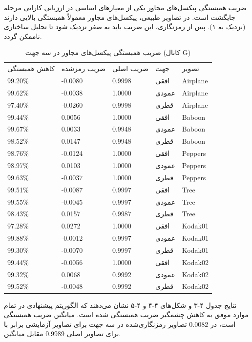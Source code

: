 ضریب همبستگی پیکسل‌های مجاور یکی از معیارهای اساسی در ارزیابی کارایی مرحله جایگشت است. در تصاویر طبیعی، پیکسل‌های مجاور معمولاً همبستگی بالایی دارند (نزدیک به ۱). پس از رمزنگاری، این ضریب باید به صفر نزدیک شود تا تحلیل ساختاری ناممکن گردد.

\begin{table}[h]
\centering
\small
\begin{tabular}{lllll}
\hline
کاهش همبستگی & ضریب رمزشده & ضریب اصلی & جهت & تصویر \\
‎99.20\%‎ & ‎-0.0080‎ & ‎0.9998‎ & افقی & ‎Airplane‎ \\
‎99.62\%‎ & ‎-0.0038‎ & ‎1.0000‎ & عمودی & ‎Airplane‎ \\
‎97.40\%‎ & ‎-0.0260‎ & ‎0.9998‎ & قطری & ‎Airplane‎ \\
‎99.44\%‎ & ‎0.0056‎ & ‎1.0000‎ & افقی & ‎Baboon‎ \\
‎99.67\%‎ & ‎0.0033‎ & ‎0.9948‎ & عمودی & ‎Baboon‎ \\
‎98.52\%‎ & ‎0.0147‎ & ‎0.9948‎ & قطری & ‎Baboon‎ \\
‎98.76\%‎ & ‎-0.0124‎ & ‎1.0000‎ & افقی & ‎Peppers‎ \\
‎98.97\%‎ & ‎0.0103‎ & ‎1.0000‎ & عمودی & ‎Peppers‎ \\
‎99.63\%‎ & ‎-0.0037‎ & ‎1.0000‎ & قطری & ‎Peppers‎ \\
‎99.51\%‎ & ‎-0.0087‎ & ‎0.9997‎ & افقی & ‎Tree‎ \\
‎99.55\%‎ & ‎-0.0045‎ & ‎0.9997‎ & عمودی & ‎Tree‎ \\
‎98.43\%‎ & ‎0.0157‎ & ‎0.9987‎ & قطری & ‎Tree‎ \\
‎97.28\%‎ & ‎0.0272‎ & ‎1.0000‎ & افقی & ‎Kodak01‎ \\
‎99.88\%‎ & ‎-0.0012‎ & ‎0.9997‎ & عمودی & ‎Kodak01‎ \\
‎99.30\%‎ & ‎-0.0070‎ & ‎0.9997‎ & قطری & ‎Kodak01‎ \\
‎99.44\%‎ & ‎-0.0056‎ & ‎1.0000‎ & افقی & ‎Kodak02‎ \\
‎99.32\%‎ & ‎0.0068‎ & ‎0.9992‎ & عمودی & ‎Kodak02‎ \\
‎99.52\%‎ & ‎-0.0048‎ & ‎0.9992‎ & قطری & ‎Kodak02‎ \\
\hline
\end{tabular}
\caption{ضریب همبستگی پیکسل‌های مجاور در سه جهت (کانال ‎G‎)}
\end{table}

نتایج جدول ۴-۳ و شکل‌های ۴-۴ و ۴-۵ نشان می‌دهند که الگوریتم پیشنهادی در تمام موارد موفق به کاهش چشمگیر ضریب همبستگی شده است. میانگین ضریب همبستگی تصاویر رمزنگاری‌شده در سه جهت برای تصاویر آزمایشی برابر با ‎0.0082‎ است، در مقابل میانگین ‎0.9989‎ برای تصاویر اصلی.

